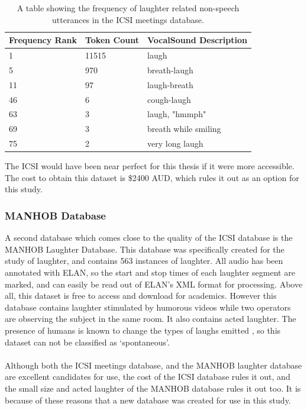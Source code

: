 \documentclass[a4paper,11pt,notitlepage]{article}
\begin{document}
\begin{table}[H]
\centering
\begin{tabular}{|l|l|l|}
\hline
\textbf{Frequency Rank} & \textbf{Token Count} & \textbf{VocalSound Description} \\ \hline \hline
1                       & 11515                & laugh                           \\ \hline
5                       & 970                  & breath-laugh                    \\ \hline
11                      & 97                   & laugh-breath                    \\ \hline
46                      & 6                    & cough-laugh                     \\ \hline
63                      & 3                    & laugh, "hmmph"                  \\ \hline
69                      & 3                    & breath while smiling            \\ \hline
75                      & 2                    & very long laugh                 \\ \hline
\end{tabular}
\caption{A table showing the frequency of laughter related non-speech utterances in the ICSI meetings database\cite{laskowski2007correlation}.}
\label{table:icsi_meeting_utterance_frequency}
\end{table}

\noindent
The ICSI would have been near perfect for this thesis if it were more accessible. The cost to obtain this dataset is \$2400 AUD, which rules it out as an option for this study.
\subsubsection{MANHOB Database}
A second database which comes close to the quality of the ICSI database is the MANHOB Laughter Database. This database was specifically created for the study of laughter, and contains 563 instances of laughter. All audio has been annotated with ELAN\cite{sloetjes2008annotation}, so the start and stop times of each laughter segment are marked, and can easily be read out of ELAN's XML format for processing. Above all, this dataset is free to access and download for academics. However this database contains laughter stimulated by humorous videos while two operators are observing the subject in the same room. It also contains acted laughter. The presence of humans is known to change the types of laughs emitted \cite{campbell2007whom}, so this dataset can not be classified as `spontaneous'.\\
\\
Although both the ICSI meetings database, and the MANHOB laughter database are excellent candidates for use, the cost of the ICSI database rules it out, and the small size and acted laughter of the MANHOB database rules it out too. It is because of these reasons that a new database was created for use in this study.
\end{document}
